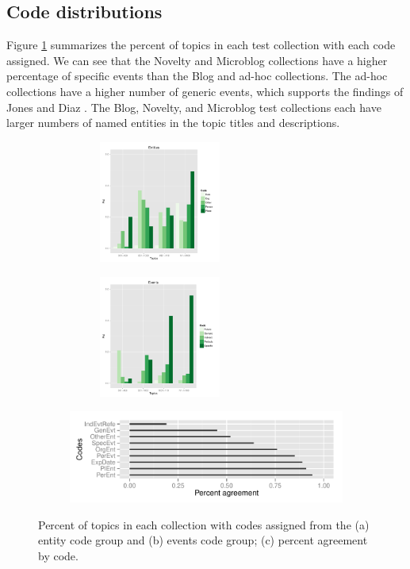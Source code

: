 \documentclass{sig-alternate}
\begin{document}
\subsection{Code distributions}

Figure \ref{fig.codedist} summarizes the percent of topics in each test collection with each code assigned. We can see that the Novelty and Microblog  collections have a higher percentage of specific events than the Blog and ad-hoc collections. The ad-hoc collections have a higher number of generic events, which supports the findings of Jones and Diaz \cite{Jones2007}. The Blog, Novelty, and Microblog test collections each have larger numbers of named entities in the topic titles and descriptions.

\begin{figure}[!ht]
\centering
\begin{subfigure}{.5\textwidth}
  \centering
\includegraphics[width=6cm, height=4cm]{plots/topic-groups-ent.pdf}
\end{subfigure}%
\begin{subfigure}{.5\textwidth}
  \centering
\includegraphics[width=6cm, height=4cm]{plots/topic-groups-evt.pdf}
\end{subfigure}
\begin{subfigure}{\textwidth}
\includegraphics[width=11cm]{plots/coder-agreement.pdf}
\end{subfigure}
\caption{Percent of topics in each collection with codes assigned from the (a) entity code group and (b) events code group; (c) percent agreement by code.}
\label{fig.codedist}
\end{figure}
\end{document}
